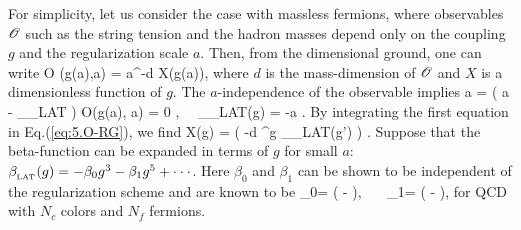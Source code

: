  For simplicity, let us consider the case with massless fermions, where 
 observables
   ${\cal O}$ such as the string tension and the hadron masses  depend only
   on the coupling $g$ and the  regularization scale $a$. 
   Then,  from the dimensional ground, one can  write  
     \beq
\label{eq:5.O-dim}
 {\cal O} (g(a),a) = a^{-d} X(g(a)),
 \eeq
 where $d$ is the mass-dimension of ${\cal O}$ and $X$ is a dimensionless
 function of $g$.  The $a$-independence of the observable implies
 \beq
\label{eq:5.O-RG}
 a 
  =  
  \left( a  
 - \beta_{_{\rm LAT}}   \right) {\cal O}(g(a), a)  = 0 , 
\ \   \beta_{_{\rm LAT}}(g) =  -a  .
\eeq
By integrating the first equation in Eq.(\ref{eq:5.O-RG}),  we find
\beq
\label{eq:5.lat-F}
 X(g) = 
 \exp \left( -d \int^g  {\beta_{_{\rm LAT}}(g')} \right) .
 \eeq
Suppose that 
 the beta-function can be expanded in terms of $g$ for small $a$:
$\beta_{_{\rm LAT}}(g)   = 
  - \beta_0 g^3 - \beta_1  g^5 + \cdot \cdot \cdot $. Here
  $\beta_0$ and $\beta_1$ can be shown to be independent of the 
   regularization scheme and are known to be 
\beq
\beta_0=  \left( - \right),
\ \ \  \beta_1=  \left( - \right),
\eeq
           for QCD with $N_c$ colors and     $N_f$ fermions.
  
